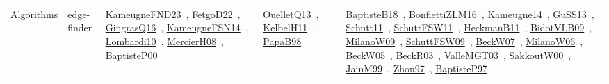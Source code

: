 {\begin{longtable}{lp{3cm}>{\raggedright\arraybackslash}p{6cm}>{\raggedright\arraybackslash}p{6cm}>{\raggedright\arraybackslash}p{8cm}}
Algorithms & edge-finder & \href{../works/KameugneFND23.pdf}{KameugneFND23}~\cite{KameugneFND23}, \href{../works/FetgoD22.pdf}{FetgoD22}~\cite{FetgoD22}, \href{../works/GingrasQ16.pdf}{GingrasQ16}~\cite{GingrasQ16}, \href{../works/KameugneFSN14.pdf}{KameugneFSN14}~\cite{KameugneFSN14}, \href{../works/Lombardi10.pdf}{Lombardi10}~\cite{Lombardi10}, \href{../works/MercierH08.pdf}{MercierH08}~\cite{MercierH08}, \href{../works/BaptisteP00.pdf}{BaptisteP00}~\cite{BaptisteP00} & \href{../works/OuelletQ13.pdf}{OuelletQ13}~\cite{OuelletQ13}, \href{../works/KelbelH11.pdf}{KelbelH11}~\cite{KelbelH11}, \href{../works/PapaB98.pdf}{PapaB98}~\cite{PapaB98} & \href{../works/BaptisteB18.pdf}{BaptisteB18}~\cite{BaptisteB18}, \href{../works/BonfiettiZLM16.pdf}{BonfiettiZLM16}~\cite{BonfiettiZLM16}, \href{../works/Kameugne14.pdf}{Kameugne14}~\cite{Kameugne14}, \href{../works/GuSS13.pdf}{GuSS13}~\cite{GuSS13}, \href{../works/Schutt11.pdf}{Schutt11}~\cite{Schutt11}, \href{../works/SchuttFSW11.pdf}{SchuttFSW11}~\cite{SchuttFSW11}, \href{../works/HeckmanB11.pdf}{HeckmanB11}~\cite{HeckmanB11}, \href{../works/BidotVLB09.pdf}{BidotVLB09}~\cite{BidotVLB09}, \href{../works/MilanoW09.pdf}{MilanoW09}~\cite{MilanoW09}, \href{../works/SchuttFSW09.pdf}{SchuttFSW09}~\cite{SchuttFSW09}, \href{../works/BeckW07.pdf}{BeckW07}~\cite{BeckW07}, \href{../works/MilanoW06.pdf}{MilanoW06}~\cite{MilanoW06}, \href{../works/BeckW05.pdf}{BeckW05}~\cite{BeckW05}, \href{../works/BeckR03.pdf}{BeckR03}~\cite{BeckR03}, \href{../works/ValleMGT03.pdf}{ValleMGT03}~\cite{ValleMGT03}, \href{../works/SakkoutW00.pdf}{SakkoutW00}~\cite{SakkoutW00}, \href{../works/JainM99.pdf}{JainM99}~\cite{JainM99}, \href{../works/Zhou97.pdf}{Zhou97}~\cite{Zhou97}, \href{../works/BaptisteP97.pdf}{BaptisteP97}~\cite{BaptisteP97}\\

\end{longtable}}
